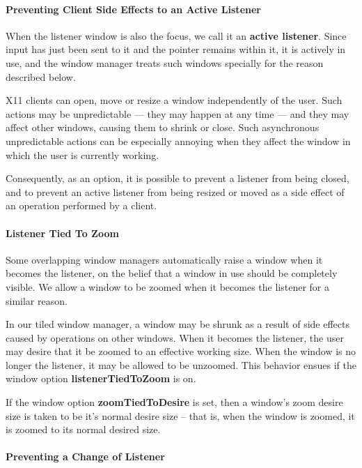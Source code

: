 \paragraph{Preventing Client Side Effects to an Active Listener}

When the listener window is also the focus, we call it an {\bf active
listener}.  Since input has just been sent to it and the pointer remains
within it, it is actively in use, and the window manager treats such
windows specially for the reason described below.

X11 clients can open, move or resize a window independently
of the user.
Such actions may be unpredictable --- they may happen at any time --- and
they may affect other windows, causing them to shrink or close.
Such asynchronous unpredictable actions can be especially annoying when
they affect the window in which the user is currently working.

Consequently, as an option, it is possible to prevent a listener from being
closed, and to prevent an active listener from being resized or moved as
a side effect of an operation performed by a client.

\paragraph{Listener Tied To Zoom}

Some overlapping window managers automatically raise a window when it
becomes the listener, on the belief that a window in use should be
completely visible.
We allow a window to be zoomed when it becomes the listener for a similar
reason.

In our tiled window manager, a window may be shrunk as a result of side
effects caused by operations on other windows.  When it becomes the
listener, the user may desire that it be zoomed to an effective working
size.  When the window is no longer the listener, it may be allowed to be
unzoomed.  This behavior ensues if the window option
{\bf listenerTiedToZoom} is on.

If the window option {\bf zoomTiedToDesire} is set, then a window's zoom
desire size is taken to be it's normal desire size -- that is, when the
window is zoomed, it is zoomed to its normal desired size. 

\paragraph{Preventing a Change of Listener}

